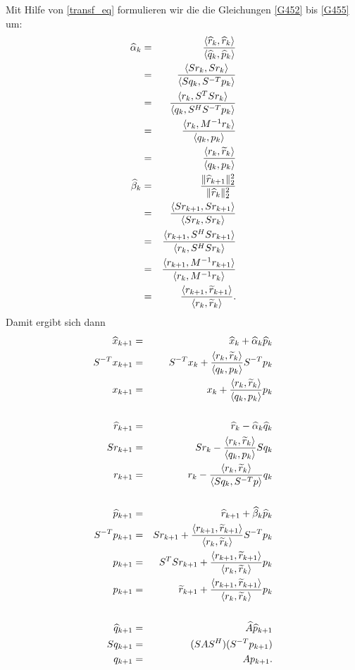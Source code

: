 Mit Hilfe von \eqref{transf_eq} formulieren wir die die Gleichungen \eqref{G452} bis \eqref{G455} um:
\begin{eqnarray*}
\widehat{\alpha}_k&=&\dfrac{\langle\widehat r_k,\widehat r_k\rangle }{\langle\widehat q_k,\widehat p_k\rangle }\\
&=&\dfrac{\langle Sr_k,Sr_k\rangle }{\langle Sq_k,S^{-T}p_k\rangle }\\
&=&\dfrac{\langle r_k,S^{T}Sr_k\rangle }{\langle q_k,S^HS^{-T}p_k\rangle }\\
&=&\dfrac{\langle r_k,M^{-1}r_k \rangle}{\langle q_k,p_k \rangle }\\
&=&\dfrac{\langle r_k,\widetilde{r}_k\rangle }{\langle q_k,p_k\rangle }\\
\widehat{\beta}_k&=&
\frac{\| \widehat{r}_{k+1} \|_2^2}{\| \widehat{r}_k \|_2^2}\\
&=&\dfrac{\langle Sr_{k+1},Sr_{k+1}\rangle }{\langle Sr_k,Sr_k\rangle }\\
&=&\dfrac{\langle r_{k+1},S^HSr_{k+1}\rangle }{\langle r_k,S^HSr_k\rangle }\\
&=&\dfrac{\langle r_{k+1},M^{-1}r_{k+1}\rangle }{\langle r_k,M^{-1}r_k\rangle }\\
&=&\dfrac{\langle r_{k+1},\widetilde{r}_{k+1}\rangle }{\langle r_k,\widetilde{r}_k\rangle }.
\end{eqnarray*}
Damit ergibt sich dann
\setcounter{equation}{1}
\renewcommand{\theequation}{\thesection.\arabic{equation}'}
\begin{eqnarray}
\notag\widehat{x}_{k+1} &=& \widehat{x}_k + \widehat{\alpha}_k \widehat{p}_k\\
\notag S^{-T}x_{k+1}&=&S^{-T}x_k +\dfrac{\langle r_k,\widetilde{r}_k\rangle }{\langle q_k,p_k\rangle }  S^{-T}p_k\\
x_{k+1}&=&x_k +\dfrac{\langle r_k,\widetilde{r}_k\rangle }{\langle q_k,p_k\rangle } p_k\\\notag\\
\notag \widehat{r}_{k+1} & = & \widehat{r}_k - \widehat{\alpha}_k \widehat{q}_k \\
\notag Sr_{k+1}&=&Sr_{k}-\dfrac{\langle r_k,\widetilde{r}_k\rangle }{\langle q_k,p_k\rangle }  Sq_k\\
r_{k+1}&=&r_{k}-\dfrac{\langle r_k,\widetilde{r}_k\rangle }{\langle Sq_k,S^{-T}p\rangle }  q_k\\\notag\\
\notag \widehat{p}_{k+1} & = & \widehat{r}_{k+1} + \widehat{\beta}_k\widehat{p}_k \\
\notag S^{-T}p_{k+1} & = & S r_{k+1}+\dfrac{\langle r_{k+1},\widetilde{r}_{k+1}\rangle }{\langle r_k,\widetilde{r}_k\rangle }S^{-T} {p}_k \\
\notag p_{k+1} & = & S^{T}S r_{k+1}+\dfrac{\langle r_{k+1},\widetilde{r}_{k+1}\rangle }{\langle r_k,\widetilde{r}_k\rangle } {p}_k \\
 p_{k+1}& = & \widetilde{r}_{k+1}+\dfrac{\langle r_{k+1},\widetilde{r}_{k+1}\rangle }{\langle r_k,\widetilde{r}_k\rangle } {p}_k \\\notag\\
\notag \widehat{q}_{k+1} & = & \widehat{A} \widehat{p}_{k+1} \\
\notag Sq_{k+1}&=&(SAS^H)(S^{-T}p_{k+1})\\
q_{k+1}&=&A p_{k+1}.
\end{eqnarray}
